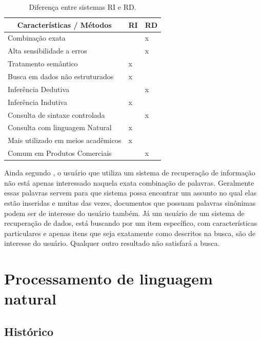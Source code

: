 \begin{table}[htb]
	\centering
	\caption{Diferença entre sistemas \ac{RI} e \ac{RD}.}
	\label{tab:RIxRD}
	\begin{tabular}{|m{7cm} | m{2cm} | m{2cm} |}

		\hline
		
		\multicolumn{1}{|c|}{\bfseries Características / Métodos } & \multicolumn{1}{c|}{\bfseries RI} & \multicolumn{1}{c|}{\bfseries RD}\\ \hline
		Combinação exata   					&		&	x 	\\ \hline
		Alta sensibilidade a erros   			&		&	x  	\\ \hline
		Tratamento semântico   				&	x 	&	 	\\ \hline
		Busca em dados não estruturados   	&	x 	&	 	\\ \hline
		Inferência Dedutiva  					&		&	x  	\\ \hline
		Inferência Indutiva   					&	x 	&	 	\\ \hline
		Consulta de sintaxe controlada   		&		&	x 	\\ \hline
		Consulta com linguagem Natural   	&	x 	&	 	\\ \hline
		Mais utilizado em meios acadêmicos   &	x 	&	 	\\ \hline
		Comum em Produtos Comerciais   	&		&	x 	\\ \hline
		
	\end{tabular}
\end{table}

Ainda segundo \cite{Fred2008}, o usuário que utiliza um sistema de recuperação de informação não está apenas interessado naquela exata combinação de palavras. Geralmente essas palavras servem para que sistema possa encontrar um assunto no qual elas estão inseridas e muitas das vezes, documentos que possuam palavras sinônimas podem ser de interesse do usuário também. Já um usuário de um sistema de recuperação de dados, está buscando por um item específico, com características particulares e apenas itens que seja exatamente como descritos na busca, são de interesse do usuário. Qualquer outro resultado não satisfará a busca.

\section{Processamento de linguagem natural}
\subsection{Histórico}
